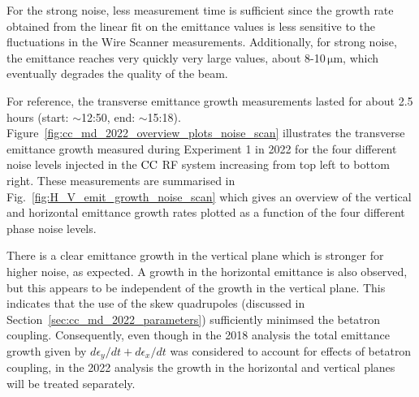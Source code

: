 For the strong noise, less measurement time is sufficient since the growth rate obtained from the linear fit on the emittance values is less sensitive to the fluctuations in the Wire Scanner measurements. Additionally, for strong noise, the emittance reaches very quickly very large values, about 8-10\,$\mathrm{\mu m}$, which eventually degrades the quality of the beam.

For reference, the transverse emittance growth measurements lasted for about 2.5\,hours (start: $\sim$12:50, end: $\sim$15:18). Figure~\ref{fig:cc_md_2022_overview_plots_noise_scan} illustrates the transverse emittance growth measured during Experiment 1 in 2022 for the four different noise levels injected in the ${\mathrm{CC}}$ RF system increasing from top left to bottom right. These measurements are summarised in Fig.~\ref{fig:H_V_emit_growth_noise_scan} which gives an overview of the vertical and horizontal emittance growth rates plotted as a function of the four different phase noise levels. 

There is a clear emittance growth in the vertical plane which is stronger for higher noise, as expected. A growth in the horizontal emittance is also observed, but this appears to be independent of the growth in the vertical plane. This indicates that the use of the skew quadrupoles (discussed in Section~\ref{sec:cc_md_2022_parameters}) sufficiently minimsed the betatron coupling. Consequently, even though in the 2018 analysis the total emittance growth given by $d\epsilon_y/dt +d\epsilon_x/dt $ was considered to account for effects of betatron coupling, in the 2022 analysis the growth in the horizontal and vertical planes will be treated separately.


